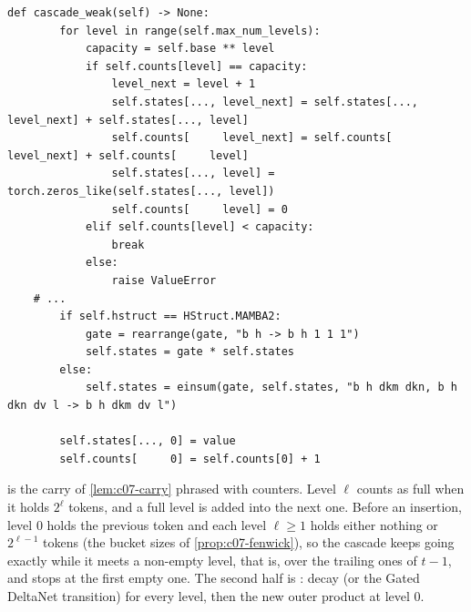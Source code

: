 \begin{lstlisting}[caption={Excerpt from \texttt{repos/\allowbreak HanGuo97\_\_log-linear-attention/\allowbreak hattention/\allowbreak recurrent.py} (class \texttt{HState}).},label={lst:c07-hstate}]
    def cascade_weak(self) -> None:
        for level in range(self.max_num_levels):
            capacity = self.base ** level
            if self.counts[level] == capacity:
                level_next = level + 1
                self.states[..., level_next] = self.states[..., level_next] + self.states[..., level]
                self.counts[     level_next] = self.counts[     level_next] + self.counts[     level]
                self.states[..., level] = torch.zeros_like(self.states[..., level])
                self.counts[     level] = 0
            elif self.counts[level] < capacity:
                break
            else:
                raise ValueError
    # ...
        if self.hstruct == HStruct.MAMBA2:
            gate = rearrange(gate, "b h -> b h 1 1 1")
            self.states = gate * self.states
        else:
            self.states = einsum(gate, self.states, "b h dkm dkn, b h dkn dv l -> b h dkm dv l")

        self.states[..., 0] = value
        self.counts[     0] = self.counts[0] + 1
\end{lstlisting}

\noindent
{} is the carry of \cref{lem:c07-carry} phrased with counters. Level
$\ell$ counts as full when it holds $2^\ell$ tokens, and a full level is added into the next
one. Before an insertion, level $0$ holds the previous token and each level $\ell\ge1$ holds
either nothing or $2^{\ell-1}$ tokens (the bucket sizes of \cref{prop:c07-fenwick}), so the
cascade keeps going exactly while it meets a non-empty level, that is, over the trailing ones
of $t-1$, and stops at the first empty one. The second half is : decay (or the
Gated DeltaNet transition) for every level, then the new outer product at level $0$.

